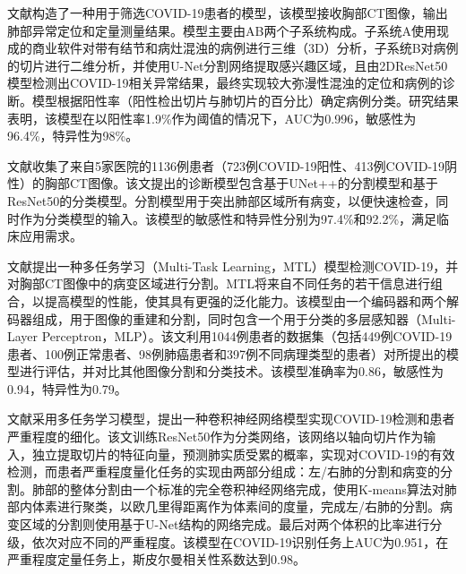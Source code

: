 \documentclass[journal,twoside,web]{ieeecolor}
\begin{document}
文献\cite{b15}构造了一种用于筛选COVID-19患者的模型，该模型接收胸部CT图像，输出肺部异常定位和定量测量结果。模型主要由AB两个子系统构成。子系统A使用现成的商业软件对带有结节和病灶混浊的病例进行三维（3D）分析，子系统B对病例的切片进行二维分析，并使用U-Net分割网络提取感兴趣区域，且由2DResNet50模型\cite{b16}检测出COVID-19相关异常结果，最终实现较大弥漫性混浊的定位和病例的诊断。模型根据阳性率（阳性检出切片与肺切片的百分比）确定病例分类。研究结果表明，该模型在以阳性率1.9\%作为阈值的情况下，AUC为0.996，敏感性为96.4\%，特异性为98\%。

文献\cite{b17}收集了来自5家医院的1136例患者（723例COVID-19阳性、413例COVID-19阴性）的胸部CT图像。该文提出的诊断模型包含基于UNet++的分割模型和基于ResNet50的分类模型。分割模型用于突出肺部区域所有病变，以便快速检查，同时作为分类模型的输入。该模型的敏感性和特异性分别为97.4\%和92.2\%，满足临床应用需求。

文献\cite{b18}提出一种多任务学习（Multi-Task Learning，MTL）模型检测COVID-19，并对胸部CT图像中的病变区域进行分割。MTL将来自不同任务的若干信息进行组合，以提高模型的性能，使其具有更强的泛化能力。该模型由一个编码器和两个解码器组成，用于图像的重建和分割，同时包含一个用于分类的多层感知器（Multi-Layer Perceptron，MLP）。该文利用1044例患者的数据集（包括449例COVID-19患者、100例正常患者、98例肺癌患者和397例不同病理类型的患者）对所提出的模型进行评估，并对比其他图像分割和分类技术。该模型准确率为0.86，敏感性为0.94，特异性为0.79。

文献\cite{b19}采用多任务学习模型，提出一种卷积神经网络模型实现COVID-19检测和患者严重程度的细化。该文训练ResNet50作为分类网络，该网络以轴向切片作为输入，独立提取切片的特征向量，预测肺实质受累的概率，实现对COVID-19的有效检测，而患者严重程度量化任务的实现由两部分组成：左/右肺的分割和病变的分割。肺部的整体分割由一个标准的完全卷积神经网络完成，使用K-means算法对肺部内体素进行聚类，以欧几里得距离作为体素间的度量，完成左/右肺的分割。病变区域的分割则使用基于U-Net结构的网络完成。最后对两个体积的比率进行分级，依次对应不同的严重程度。该模型在COVID-19识别任务上AUC为0.951，在严重程度定量任务上，斯皮尔曼相关性系数达到0.98。
\end{document}
